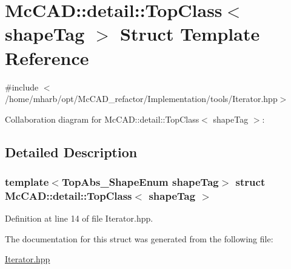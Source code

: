 \hypertarget{structMcCAD_1_1detail_1_1TopClass}{}\section{Mc\+C\+AD\+:\+:detail\+:\+:Top\+Class$<$ shape\+Tag $>$ Struct Template Reference}
\label{structMcCAD_1_1detail_1_1TopClass}


{\ttfamily \#include $<$/home/mharb/opt/\+Mc\+C\+A\+D\+\_\+refactor/\+Implementation/tools/\+Iterator.\+hpp$>$}



Collaboration diagram for Mc\+C\+AD\+:\+:detail\+:\+:Top\+Class$<$ shape\+Tag $>$\+:


\subsection{Detailed Description}
\subsubsection*{template$<$Top\+Abs\+\_\+\+Shape\+Enum shape\+Tag$>$\newline
struct Mc\+C\+A\+D\+::detail\+::\+Top\+Class$<$ shape\+Tag $>$}



Definition at line 14 of file Iterator.\+hpp.



The documentation for this struct was generated from the following file\+:\begin{DoxyCompactItemize}
\item 
\hyperlink{Iterator_8hpp}{Iterator.\+hpp}\end{DoxyCompactItemize}

